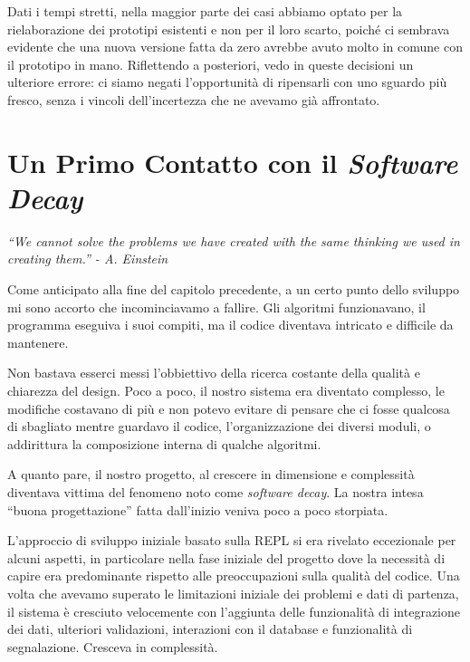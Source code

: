 \documentclass[12pt]{report}
\begin{document}
Dati i tempi stretti, nella maggior parte dei casi abbiamo optato per
la rielaborazione dei prototipi esistenti e non per il loro scarto,
poiché ci sembrava evidente che una nuova versione fatta da zero avrebbe avuto
molto in comune con il prototipo in mano. Riflettendo a posteriori, vedo
in queste decisioni un ulteriore errore: ci siamo negati l'opportunità 
di ripensarli con uno sguardo più fresco, senza i vincoli 
dell'incertezza che ne avevamo già affrontato. 

% 
%
%
\chapter{Un Primo Contatto con il \textit{Software Decay}}
\label{cap4}

\vspace{1cm}
\begin{flushright}
	\textit{
	``We cannot solve the problems we have created
	with the same thinking we used in creating them.'' - A. Einstein
	}
\end{flushright}
\vspace{1cm}

Come anticipato alla fine del capitolo precedente, a un certo punto
dello sviluppo mi sono accorto che incominciavamo a fallire. 
Gli algoritmi funzionavano, il programma eseguiva i suoi compiti, ma il
codice diventava intricato e difficile da mantenere.

Non bastava esserci messi l'obbiettivo della ricerca costante della qualità e 
chiarezza del design. Poco a poco, il nostro sistema era diventato complesso, 
le modifiche costavano di più e non potevo evitare di pensare che ci fosse 
qualcosa di sbagliato mentre guardavo il codice, l'organizzazione dei diversi 
moduli, o addirittura la composizione interna di qualche algoritmi. 

A quanto pare, il nostro progetto, al crescere in dimensione e complessità 
diventava vittima del fenomeno noto come \textit{software decay}.
La nostra intesa ``buona progettazione'' fatta 
dall'inizio veniva poco a poco storpiata.

L'approccio di sviluppo iniziale basato sulla REPL si era rivelato eccezionale 
per alcuni aspetti, in particolare nella fase iniziale del progetto dove la 
necessità di capire era predominante rispetto alle preoccupazioni sulla 
qualità del codice. Una volta che avevamo superato le limitazioni iniziale dei 
problemi e dati di partenza, il sistema è cresciuto velocemente con l'aggiunta 
delle funzionalità di integrazione dei dati, ulteriori validazioni, interazioni 
con il database e funzionalità di segnalazione. Cresceva in complessità. 
\end{document}
